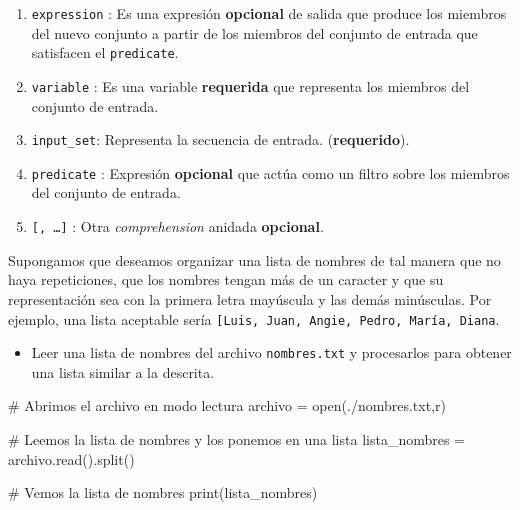 \documentclass[
  spanish,
  letterpaper,
]{scrbook}
\newenvironment{Shaded}{\begin{snugshade}}{\end{snugshade}}
\newcommand{\BuiltInTok}[1]{\textcolor[rgb]{0.00,0.23,0.31}{#1}}
\newcommand{\CommentTok}[1]{\textcolor[rgb]{0.37,0.37,0.37}{#1}}
\newcommand{\NormalTok}[1]{\textcolor[rgb]{0.00,0.23,0.31}{#1}}
\newcommand{\OperatorTok}[1]{\textcolor[rgb]{0.37,0.37,0.37}{#1}}
\newcommand{\StringTok}[1]{\textcolor[rgb]{0.13,0.47,0.30}{#1}}
\providecommand{\tightlist}{%
  \setlength{\itemsep}{0pt}\setlength{\parskip}{0pt}}
\theoremstyle{definition}
\theoremstyle{remark}
\newcounter{quartocalloutexmno}
\newcommand{\quartocalloutexm}[1]{\refstepcounter{quartocalloutexmno}\label{#1}}
\begin{document}
\begin{enumerate}
\def\labelenumi{\arabic{enumi}.}
\item
  \texttt{expression} : Es una expresión \textbf{opcional} de salida que
  produce los miembros del nuevo conjunto a partir de los miembros del
  conjunto de entrada que satisfacen el \texttt{predicate}.
\item
  \texttt{variable} : Es una variable \textbf{requerida} que representa
  los miembros del conjunto de entrada.
\item
  \texttt{input\_set}: Representa la secuencia de entrada.
  (\textbf{requerido}).
\item
  \texttt{predicate} : Expresión \textbf{opcional} que actúa como un
  filtro sobre los miembros del conjunto de entrada.
\item
  \texttt{{[},\ …{]}} : Otra \emph{comprehension} anidada
  \textbf{opcional}.
\end{enumerate}

\begin{tcolorbox}[enhanced jigsaw, colframe=quarto-callout-tip-color-frame, opacityback=0, toprule=.15mm, colback=white, coltitle=black, leftrule=.75mm, arc=.35mm, breakable, left=2mm, bottomtitle=1mm, rightrule=.15mm, bottomrule=.15mm, colbacktitle=quarto-callout-tip-color!10!white, toptitle=1mm, titlerule=0mm, opacitybacktitle=0.6, title={Tip \ref*{exm-r-8}}]

\quartocalloutexm{exm-r-8} 

Supongamos que deseamos organizar una lista de nombres de tal manera que
no haya repeticiones, que los nombres tengan más de un caracter y que su
representación sea con la primera letra mayúscula y las demás
minúsculas. Por ejemplo, una lista aceptable sería
\texttt{{[}\textquotesingle{}Luis\textquotesingle{},\ \textquotesingle{}Juan\textquotesingle{},\ \textquotesingle{}Angie\textquotesingle{},\ \textquotesingle{}Pedro\textquotesingle{},\ \textquotesingle{}María\textquotesingle{},\ \textquotesingle{}Diana\textquotesingle{}{]}}.

\begin{itemize}
\tightlist
\item
  Leer una lista de nombres del archivo \texttt{nombres.txt} y
  procesarlos para obtener una lista similar a la descrita.
\end{itemize}

\end{tcolorbox}

\begin{Shaded}
\begin{Highlighting}[]
\CommentTok{\# Abrimos el archivo en modo lectura}
\NormalTok{archivo }\OperatorTok{=} \BuiltInTok{open}\NormalTok{(}\StringTok{\textquotesingle{}./nombres.txt\textquotesingle{}}\NormalTok{,}\StringTok{\textquotesingle{}r\textquotesingle{}}\NormalTok{)}

\CommentTok{\# Leemos la lista de nombres y los ponemos en una lista}
\NormalTok{lista\_nombres }\OperatorTok{=}\NormalTok{ archivo.read().split()}

\CommentTok{\# Vemos la lista de nombres}
\BuiltInTok{print}\NormalTok{(lista\_nombres)}
\end{Highlighting}
\end{Shaded}
\end{document}
